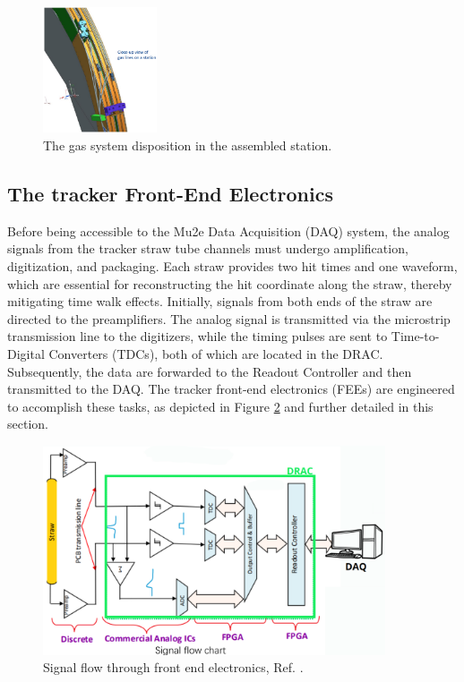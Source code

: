\begin{figure}[!h]
    \centering
    \includegraphics[width =0.3\textwidth]{figures/png/Screenshot_20240706_163631.png}
    \caption{The gas system disposition in the assembled station.}
    \label{fig:gassystem}
\end{figure}

\subsection{The tracker Front-End Electronics}
Before being accessible to the Mu2e Data Acquisition (DAQ) system, the analog signals 
from the tracker straw tube channels must undergo amplification, digitization, and packaging. 
Each straw provides two hit times and one waveform, which are essential for 
reconstructing the hit coordinate along the straw, thereby mitigating time walk effects.
Initially, signals from both ends of the straw are directed to the preamplifiers. 
The analog signal is transmitted via the microstrip transmission line to the digitizers, 
while the timing pulses are sent to Time-to-Digital Converters (TDCs), both of which 
are located in the DRAC. Subsequently, the data are forwarded to the Readout Controller and then transmitted to the DAQ.
The tracker front-end electronics (FEEs) are engineered to accomplish these tasks, as depicted in Figure \ref{fig:flowfee} and further detailed in this section.
\\
\begin{figure}[!h]
    \centering
    \includegraphics[width =0.9\textwidth]{figures/png/Screenshot_20240529_133230.png}
    \caption{Signal flow through front end electronics, Ref. \cite{bartoszek2015mu2e}.}
    \label{fig:flowfee}
    \end{figure}
